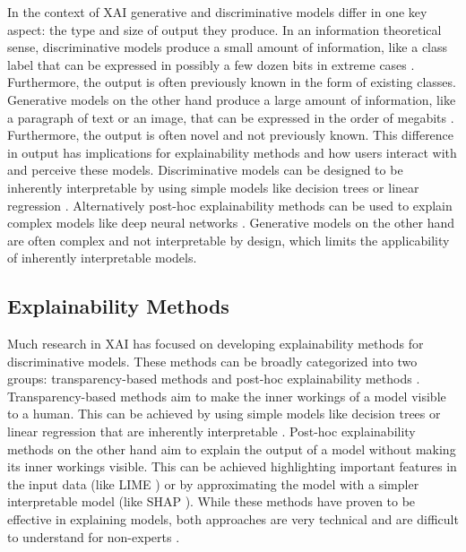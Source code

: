 In the context of \ac{XAI} generative and discriminative models differ in one key aspect: the type and size of output they produce. In an information theoretical sense, discriminative models produce a small amount of information, like a class label that can be expressed in possibly a few dozen bits in extreme cases \parencite{Schneider2024}. Furthermore, the output is often previously known in the form of existing classes. Generative models on the other hand produce a large amount of information, like a paragraph of text or an image, that can be expressed in the order of megabits \parencite{Schneider2024}. Furthermore, the output is often novel and not previously known. This difference in output has implications for explainability methods and how users interact with and perceive these models. Discriminative models can be designed to be inherently interpretable by using simple models like decision trees or linear regression \parencite{Rudin2019}. Alternatively post-hoc explainability methods can be used to explain complex models like deep neural networks \parencite{Ribeiro2016, Lundberg2017}. Generative models on the other hand are often complex and not interpretable by design, which limits the applicability of inherently interpretable models.

\subsection{Explainability Methods} \label{ssec:explainability_methods}

Much research in \ac{XAI} has focused on developing explainability methods for discriminative models. These methods can be broadly categorized into two groups: transparency-based methods and post-hoc explainability methods \parencite{Arieta2020}. Transparency-based methods aim to make the inner workings of a model visible to a human. This can be achieved by using simple models like decision trees or linear regression that are inherently interpretable \parencite{Rudin2019}. Post-hoc explainability methods on the other hand aim to explain the output of a model without making its inner workings visible. This can be achieved highlighting important features in the input data (like LIME \parencite{Ribeiro2016}) or by approximating the model with a simpler interpretable model (like SHAP \parencite{Lundberg2017}). While these methods have proven to be effective in explaining models, both approaches are very technical and are difficult to understand for non-experts \parencite{Martens2025}.

